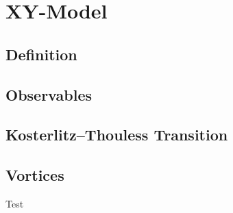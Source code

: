 \section{XY-Model}
	\subsection{Definition}
	
	\subsection{Observables}
	
	\subsection{Kosterlitz–Thouless Transition}
	
	\subsection{Vortices}
	Test